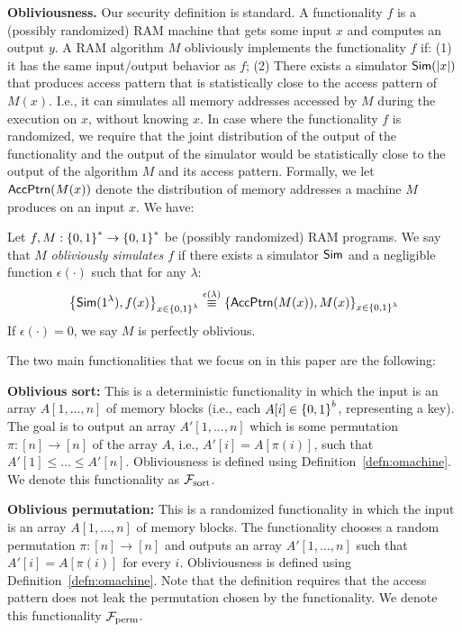 \medskip
\noindent
{\bf Obliviousness.}
Our security definition is standard. A functionality $f$ is a (possibly randomized) RAM machine that gets some input $x$ and computes an output $y$. A RAM algorithm $M$ obliviously implements the functionality $f$ if: (1) it has the same input/output behavior as $f$; (2) There exists a simulator ${\sf Sim}(\left|{x}\right|)$ that produces access pattern that is statistically close to the access pattern of $M(x)$. I.e., it can simulates all memory addresses accessed by $M$ during the execution on $x$, without knowing $x$. In case where the functionality $f$ is randomized, we require that the joint distribution of the output of the functionality and the output of the simulator would be statistically close to the output of the algorithm $M$ and its access pattern. Formally, we let ${\sf AccPtrn}(M(x))$ denote the distribution of memory addresses a machine $M$ produces on an input $x$. We have:

\begin{definition}
\label{defn:omachine}
Let $f,M:{\{0,1\}}^* \rightarrow {\{0,1\}}^*$ be (possibly randomized) RAM programs. We say that $M$ {\em obliviously simulates $f$} if there exists a  simulator ${\sf Sim}$ and a negligible function $\epsilon(\cdot)$ such that  for any $\lambda$:%
$$
\left\{{\sf Sim}(1^\lambda),f(x)\right\}_{x \in {\{0,1\}}^\lambda}\overset{\epsilon(\lambda)}{\equiv} \left\{ {\sf AccPtrn}(M(x)),M(x)\right\}_{x \in {\{0,1\}}^\lambda}
$$
If $\epsilon(\cdot)=0$, we say $M$ is perfectly oblivious. 
\end{definition}

The two main functionalities that we focus on in this paper are the following:
\begin{MyItemize}
\item {\bf Oblivious sort:} This is a deterministic functionality in which the input is an array $A[1,\ldots,n]$ of memory blocks (i.e., each $A[i] \in {\{0,1\}}^{b}$, representing a key). The goal is to output an array $A'[1,\ldots,n]$ which is some permutation $\pi:[n] \rightarrow [n]$ of the array $A$, i.e., $A'[i] = A[\pi(i)]$, such that $A'[1]\leq \ldots \leq A'[n]$. Obliviousness is defined using Definition~\ref{defn:omachine}. We denote this functionality as ${\cal F}_{\rm sort}$. 

\item {\bf Oblivious permutation:} 
This is a randomized functionality in which the input is an array $A[1,\ldots,n]$ of memory blocks. The functionality chooses a random permutation $\pi:[n] \rightarrow [n]$ and outputs an array $A'[1,\ldots,n]$ such that $A'[i] = A[\pi(i)]$ for every $i$. Obliviousness is defined using Definition~\ref{defn:omachine}. Note that the definition requires that the access pattern does not leak the permutation chosen by the functionality. We denote this functionality ${\cal F}_{\rm perm}$. 
\end{MyItemize}

